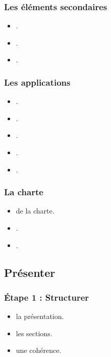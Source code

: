 \subsubsection{Les éléments secondaires}

\begin{itemize}
    \item {}.
    \item {}.
    \item {}.
\end{itemize}

\subsubsection{Les applications}

\begin{itemize}
    \item {}.
    \item {}.
    \item {}.
    \item {}.
    \item {}.
\end{itemize}

\subsubsection{La charte}

\begin{itemize}
    \item {} de la charte.
    \item {}.
    \item {}.
\end{itemize}

\subsection{Présenter}

\subsubsection{Étape 1 : Structurer}

\begin{itemize}
    \item {} la présentation.
    \item {} les sections.
    \item {} une cohérence.
\end{itemize}

